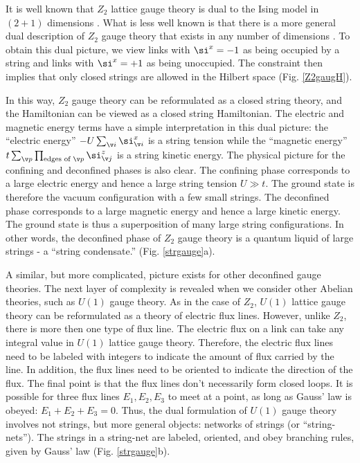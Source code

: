 \documentclass[aps,twocolumn,groupedaddress,showpacs,floatfix]{revtex4}
\begin{document}
It is well known that $Z_2$ lattice gauge theory is dual to the Ising model in
$(2+1)$ dimensions \cite{K7959}. What is less well known is that there is a
more general dual description of $Z_2$ gauge theory that exists in any number
of dimensions \cite{ItzSZ88}. To obtain this dual picture, we view links 
with $\si^x=-1$ as being occupied by a string and links with $\si^x=+1$ as 
being unoccupied. The constraint  then implies that only 
closed strings are allowed in the Hilbert space (Fig. \ref{Z2gaugH}). 
  
In this way, $Z_2$ gauge theory can be reformulated as a closed string theory,
and the Hamiltonian can be viewed as a closed string Hamiltonian. The electric
and magnetic energy terms have a simple interpretation in this dual picture:
the ``electric energy'' $-U\sum_{\v i}  \si^x_{\v i}$ is a string tension
while the ``magnetic energy'' $t\sum_{\v p}  \prod_{\text{edges of }\v p}
\si^z_{\v j}$ is a string kinetic energy. The physical picture for the
confining and deconfined phases is also clear. The confining phase corresponds
to a large electric energy and hence a large string tension $U \gg t$.  The
ground state is therefore the vacuum configuration with a few small strings.
The deconfined phase corresponds to a large magnetic energy and hence a large
kinetic energy. The ground state is thus a superposition of many large string
configurations. In other words, the deconfined phase of $Z_2$ gauge theory is
a quantum liquid of large strings - a ``string condensate.'' (Fig.
\ref{strgauge}a).

A similar, but more complicated, picture exists for other deconfined
gauge theories. The next layer of complexity is revealed when we consider
other Abelian theories, such as $U(1)$ gauge theory. As in the case of
$Z_2$, $U(1)$ lattice gauge theory can be reformulated as a theory of 
electric flux lines. However, unlike $Z_2$, there is more then one type of 
flux line. The electric flux on a link can take any integral value in $U(1)$
lattice gauge theory. Therefore, the electric flux lines need to be labeled
with integers to indicate the amount of flux carried by the line. In
addition, the flux lines need to be oriented to indicate the direction of 
the flux. The final point is that the flux lines don't necessarily form closed 
loops. It is possible for three flux lines $E_1, E_2, E_3$ to meet at a 
point, as long as Gauss' law is obeyed: $E_1 + E_2 + E_3 = 0$. Thus, the 
dual formulation of $U(1)$ gauge theory involves not strings, but 
more general objects: networks of strings (or ``string-nets''). The 
strings in a string-net are labeled, oriented, and obey branching rules,
given by Gauss' law (Fig. \ref{strgauge}b). 
\end{document}
